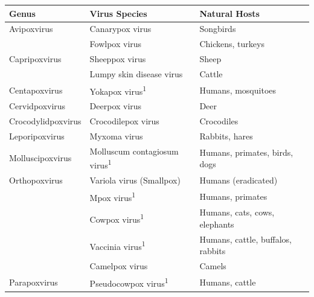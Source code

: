 \renewcommand{\arraystretch}{1.4}
\begin{table}[ht!]
	\begin{tabular}{lll}
	\hline
	\textbf{Genus}      & \textbf{Virus Species}                          & \textbf{Natural Hosts}                      \\ \hline
	Avipoxvirus         & Canarypox virus                                 & Songbirds 									\\ 
						& Fowlpox virus                                   & Chickens, turkeys                           \\ \hline
	Capripoxvirus       & Sheeppox virus                                  & Sheep                                       \\
	                    & Lumpy skin disease virus                        & Cattle                                      \\ \hline
	Centapoxvirus       & Yokapox virus\textsuperscript{1}                & Humans, mosquitoes                          \\ \hline
	Cervidpoxvirus      & Deerpox virus                                   & Deer                                        \\ \hline
	Crocodylidpoxvirus  & Crocodilepox virus                              & Crocodiles                                  \\ \hline
	Leporipoxvirus      & Myxoma virus                                    & Rabbits, hares                              \\ \hline
	Molluscipoxvirus    & Molluscum contagiosum virus\textsuperscript{1}  & Humans, primates, birds, dogs               \\ \hline
	Orthopoxvirus       & Variola virus (Smallpox)                        & Humans (eradicated)                         \\ 
						& Mpox virus\textsuperscript{1}                   & Humans, primates                            \\ 
						& Cowpox virus\textsuperscript{1}                 & Humans, cats, cows, elephants               \\ 
						& Vaccinia virus\textsuperscript{1}               & Humans, cattle, buffalos, rabbits           \\ 
						& Camelpox virus                                  & Camels                                      \\ \hline
	Parapoxvirus        & Pseudocowpox virus\textsuperscript{1}           & Humans, cattle                              \\ 

\end{tabular}
\end{table}
